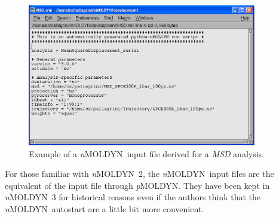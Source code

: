 \documentclass[a4paper,11pt]{report}
\newcommand{\NMOLDYN}{\textit{n}MOLDYN}
\begin{document}
\begin{figure}[h!]
\begin{center}
\includegraphics[width=10cm]{Figures/msd_input_file.eps}
\end{center}
\caption[Example of input file]{Example of a \NMOLDYN\ input file derived for a \textit{MSD} analysis.}
\label{fig:msd_input_file}
\end{figure}

For those familiar with \NMOLDYN\ 2, the \NMOLDYN\ input files are the equivalent of the input file through \textit{p}MOLDYN.
They have been kept in \NMOLDYN\ 3 for historical reasons even if the authors think that the \NMOLDYN\ autostart are a little 
bit more convenient.
\end{document}
